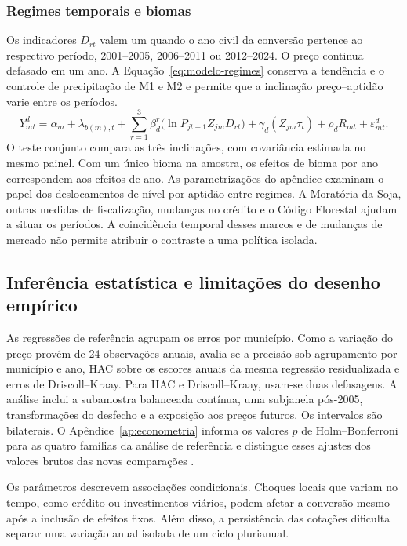 \subsubsection{Regimes temporais e biomas}
Os indicadores $D_{rt}$ valem um quando o ano civil da conversão pertence ao respectivo período, 2001--2005, 2006--2011 ou 2012--2024. O preço continua defasado em um ano. A Equação~\eqref{eq:modelo-regimes} conserva a tendência e o controle de precipitação de M1 e M2 e permite que a inclinação preço--aptidão varie entre os períodos.
\begin{equation}
    Y_{mt}^d = \alpha_m + \lambda_{b(m),t}
      + \sum_{r=1}^3 \beta_d^r \big(\ln P_{jt-1} Z_{jm} D_{rt}\big)
      + \gamma_d (Z_{jm}\tau_t) + \rho_d R_{mt} + \varepsilon_{mt}^d .
    \label{eq:modelo-regimes}
\end{equation}
O teste conjunto compara as três inclinações, com covariância estimada no mesmo painel. Com um único bioma na amostra, os efeitos de bioma por ano correspondem aos efeitos de ano. As parametrizações do apêndice examinam o papel dos deslocamentos de nível por aptidão entre regimes. A Moratória da Soja, outras medidas de fiscalização, mudanças no crédito e o Código Florestal ajudam a situar os períodos. A coincidência temporal desses marcos e de mudanças de mercado não permite atribuir o contraste a uma política isolada.

\subsection{Inferência estatística e limitações do desenho empírico}
\label{estrategia-inferencia}

As regressões de referência agrupam os erros por município. Como a variação do preço provém de 24 observações anuais, avalia-se a precisão sob agrupamento por município e ano, HAC sobre os escores anuais da mesma regressão residualizada e erros de Driscoll--Kraay. Para HAC e Driscoll--Kraay, usam-se duas defasagens. A análise inclui a subamostra balanceada contínua, uma subjanela pós-2005, transformações do desfecho e a exposição aos preços futuros. Os intervalos são bilaterais. O Apêndice~\ref{ap:econometria} informa os valores $p$ de Holm--Bonferroni para as quatro famílias da análise de referência e distingue esses ajustes dos valores brutos das novas comparações \cite{CameronMiller2015}.

Os parâmetros descrevem associações condicionais. Choques locais que variam no tempo, como crédito ou investimentos viários, podem afetar a conversão mesmo após a inclusão de efeitos fixos. Além disso, a persistência das cotações dificulta separar uma variação anual isolada de um ciclo plurianual.
